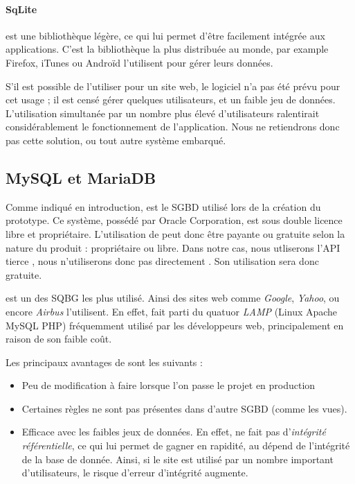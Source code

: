 \paragraph*{SqLite} est une bibliothèque légère, ce qui lui permet d'être facilement intégrée aux applications. C'est la bibliothèque la plus distribuée au monde, par example Firefox, iTunes ou Androïd l'utilisent pour gérer leurs données. 


S'il est possible de l'utiliser pour un site web, le logiciel n'a pas été prévu pour cet usage ; il est censé gérer quelques utilisateurs, et un faible jeu  de données. L'utilisation simultanée par un nombre plus élevé d'utilisateurs ralentirait considérablement le fonctionnement de l'application. Nous ne retiendrons donc pas cette solution, ou  tout autre système embarqué. 

\subsection{MySQL et MariaDB}
 
 Comme indiqué en introduction, \mysql est le SGBD utilisé lors de la création du prototype. Ce système, possédé par Oracle Corporation, est sous double licence libre et propriétaire. L'utilisation de \mysql peut donc être payante ou gratuite selon la nature du produit : propriétaire ou libre. Dans notre cas, nous utliserons l'API tierce \symfony, nous n'utiliserons donc pas directement \mysql. Son utilisation sera donc gratuite. 
 
 \mysql est un des SQBG les plus utilisé. Ainsi des sites web comme \textit{Google}, \textit{Yahoo}, ou encore \textit{Airbus}	l'utilisent. En effet, \mysql fait parti du quatuor \textit{LAMP} (Linux Apache MySQL PHP) fréquemment utilisé par les développeurs web, principalement en raison de son faible coût. 
 
 \smallbreak
 
 Les principaux avantages de \mysql sont les suivants : 
 \begin{itemize}
 \item Peu de modification à faire lorsque l'on passe le projet en production 
 \item Certaines règles ne sont pas présentes dans d'autre SGBD (comme les vues). 
 \item Efficace avec les faibles jeux de données. En effet, \mysql ne fait pas d'\textit{intégrité référentielle}, ce qui lui permet de gagner en rapidité, au dépend de l'intégrité de la base de donnée. Ainsi, si le site est utilisé par un nombre important d'utilisateurs, le risque d'erreur d'intégrité augmente. 
 \end{itemize}

